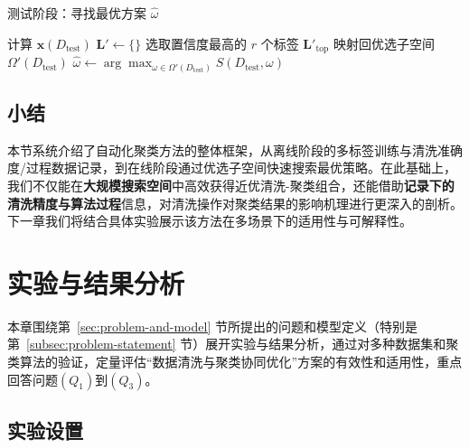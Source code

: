 \documentclass[10pt]{article} %
\numberwithin{equation}{section}
\begin{document}
\begin{algorithm}[t]
\caption{测试阶段：寻找最优方案 \(\hat{\omega}\)}
\label{alg:test-phase}

计算 $\mathbf{x}(D_{\text{test}})$\;
$\mathbf{L}' \leftarrow \{\}$\;
选取置信度最高的 $r$ 个标签 $\mathbf{L}'_{\mathrm{top}}$\;
映射回优选子空间 $\Omega'(D_{\text{test}})$\;
$\hat{\omega} \leftarrow \arg\max_{\omega \in \Omega'(D_{\text{test}})}S(D_{\text{test}}, \omega)$\;
\KwRet{$\hat{\omega}$}
\end{algorithm}

\subsection{小结}
本节系统介绍了自动化聚类方法的整体框架，从离线阶段的多标签训练与清洗准确度/过程数据记录，到在线阶段通过优选子空间快速搜索最优策略。在此基础上，我们不仅能在\textbf{大规模搜索空间}中高效获得近优清洗-聚类组合，还能借助\textbf{记录下的清洗精度与算法过程}信息，对清洗操作对聚类结果的影响机理进行更深入的剖析。下一章我们将结合具体实验展示该方法在多场景下的适用性与可解释性。



\section{实验与结果分析}
\label{sec:chapter5}

本章围绕第~\ref{sec:problem-and-model} 节所提出的问题和模型定义（特别是第~\ref{subsec:problem-statement} 节）展开实验与结果分析，通过对多种数据集和聚类算法的验证，定量评估“数据清洗与聚类协同优化”方案的有效性和适用性，重点回答问题\((Q_1)\)到\((Q_3)\)。
\vspace{-0.5em}
\subsection{\textcolor[rgb]{0.00,0.07,1.00}{实验设置}}\label{sec:exp_setting}
\end{document}
